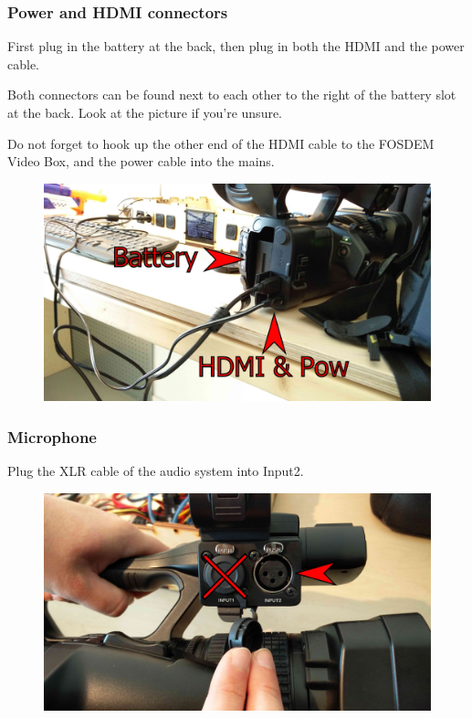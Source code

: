\documentclass{article}
\begin{document}
\subsubsection{Power and HDMI connectors}
First plug in the battery at the back, then plug in both the HDMI and the power cable.

Both connectors can be found next to each other to the right of the battery slot at the back.
Look at the picture if you're unsure.

Do not forget to hook up the other end of the HDMI cable to the FOSDEM Video Box, and the power cable into the mains.

\begin{figure}[H]
  \centering
\includegraphics[width = 120mm]{Sony01.jpg}
\end{figure}

\subsubsection{Microphone}
Plug the XLR cable of the audio system into Input2.

\begin{figure}[H]
  \centering
\includegraphics[width = 120mm]{Sony02.jpg}
\end{figure}
\end{document}
